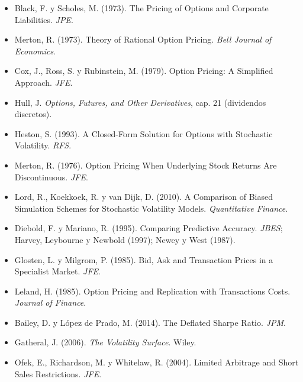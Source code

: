 \documentclass[11pt,a4paper]{article}
\begin{document}
\small
\begin{itemize}[leftmargin=1em]
\item Black, F. y Scholes, M. (1973). The Pricing of Options and Corporate Liabilities. \emph{JPE}.
\item Merton, R. (1973). Theory of Rational Option Pricing. \emph{Bell Journal of Economics}.
\item Cox, J., Ross, S. y Rubinstein, M. (1979). Option Pricing: A Simplified Approach. \emph{JFE}.
\item Hull, J. \emph{Options, Futures, and Other Derivatives}, cap. 21 (dividendos discretos).
\item Heston, S. (1993). A Closed-Form Solution for Options with Stochastic Volatility. \emph{RFS}.
\item Merton, R. (1976). Option Pricing When Underlying Stock Returns Are Discontinuous. \emph{JFE}.
\item Lord, R., Koekkoek, R. y van Dijk, D. (2010). A Comparison of Biased Simulation Schemes for Stochastic Volatility Models. \emph{Quantitative Finance}.
\item Diebold, F. y Mariano, R. (1995). Comparing Predictive Accuracy. \emph{JBES}; Harvey, Leybourne y Newbold (1997); Newey y West (1987).
\item Glosten, L. y Milgrom, P. (1985). Bid, Ask and Transaction Prices in a Specialist Market. \emph{JFE}.
\item Leland, H. (1985). Option Pricing and Replication with Transactions Costs. \emph{Journal of Finance}.
\item Bailey, D. y López de Prado, M. (2014). The Deflated Sharpe Ratio. \emph{JPM}.
\item Gatheral, J. (2006). \emph{The Volatility Surface}. Wiley.
\item Ofek, E., Richardson, M. y Whitelaw, R. (2004). Limited Arbitrage and Short Sales Restrictions. \emph{JFE}.
\end{itemize}
\end{document}
